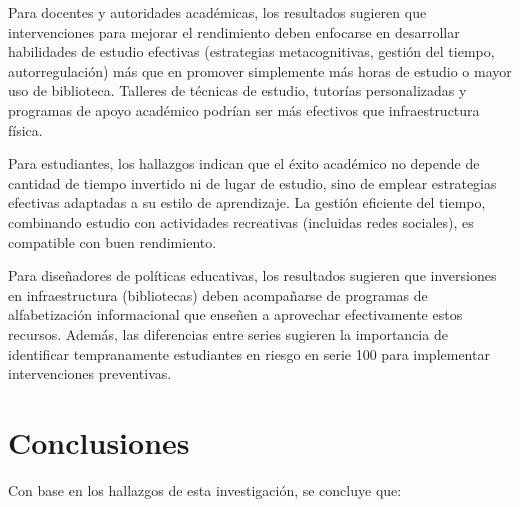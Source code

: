 \documentclass[
  stu,
  floatsintext,
  longtable,
  a4paper,
  nolmodern,
  notxfonts,
  notimes,
  12pt,
  colorlinks=true,linkcolor=blue,citecolor=blue,urlcolor=blue]{apa7}
\begin{document}
Para docentes y autoridades académicas, los resultados sugieren que
intervenciones para mejorar el rendimiento deben enfocarse en
desarrollar habilidades de estudio efectivas (estrategias
metacognitivas, gestión del tiempo, autorregulación) más que en promover
simplemente más horas de estudio o mayor uso de biblioteca. Talleres de
técnicas de estudio, tutorías personalizadas y programas de apoyo
académico podrían ser más efectivos que infraestructura física.

Para estudiantes, los hallazgos indican que el éxito académico no
depende de cantidad de tiempo invertido ni de lugar de estudio, sino de
emplear estrategias efectivas adaptadas a su estilo de aprendizaje. La
gestión eficiente del tiempo, combinando estudio con actividades
recreativas (incluidas redes sociales), es compatible con buen
rendimiento.

Para diseñadores de políticas educativas, los resultados sugieren que
inversiones en infraestructura (bibliotecas) deben acompañarse de
programas de alfabetización informacional que enseñen a aprovechar
efectivamente estos recursos. Además, las diferencias entre series
sugieren la importancia de identificar tempranamente estudiantes en
riesgo en serie 100 para implementar intervenciones preventivas.

\section{Conclusiones}\label{conclusiones}

Con base en los hallazgos de esta investigación, se concluye que:
\end{document}
